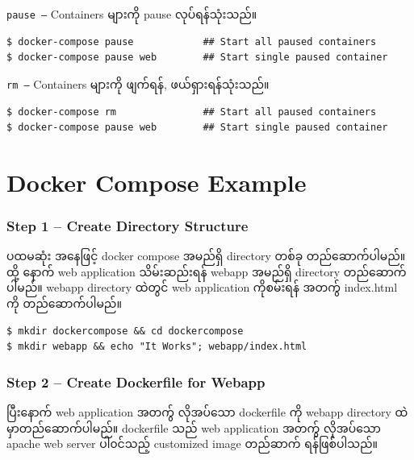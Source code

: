 \documentclass[]{article}
\begin{document}
\texttt{pause\ –} Containers များကို pause လုပ်ရန်သုံးသည်။

\begin{verbatim}
$ docker-compose pause            ## Start all paused containers
$ docker-compose pause web        ## Start single paused container
\end{verbatim}

\texttt{rm\ –} Containers များကို ဖျက်ရန်, ဖယ်ရှားရန်သုံးသည်။

\begin{verbatim}
$ docker-compose rm               ## Start all paused containers
$ docker-compose pause web        ## Start single paused container
\end{verbatim}

\pagebreak

\hypertarget{docker-compose-example}{%
\section{Docker Compose Example}\label{docker-compose-example}}

\hypertarget{step-1-create-directory-structure}{%
\subsubsection{Step 1 -- Create Directory
Structure}\label{step-1-create-directory-structure}}

ပထမဆုံး အနေဖြင့် docker compose အမည်ရှိ directory တစ်ခု တည်ဆောက်ပါမည်။
ထို့ နောက် web application သိမ်းဆည်းရန် webapp အမည်ရှိ directory
တည်ဆောက်ပါမည်။ webapp directory ထဲတွင် web application ကိုစမ်းရန် အတက်ွ
index.html ကို တည်ဆောက်ပါမည်။

\begin{verbatim}
$ mkdir dockercompose && cd dockercompose
$ mkdir webapp && echo "It Works"; webapp/index.html
\end{verbatim}

\hypertarget{step-2-create-dockerfile-for-webapp}{%
\subsubsection{Step 2 -- Create Dockerfile for
Webapp}\label{step-2-create-dockerfile-for-webapp}}

ပြီးနောက် web application အတက်ွ လိုအပ်သော dockerfile ကို webapp
directory ထဲမှာတည်ဆောက်ပါမည်။ dockerfile သည် web application အတက်ွ
လိုအပ်သော apache web server ပါ၀င်သည့် customized image တည်ဆာက်
ရန်ဖြစ်ပါသည်။
\end{document}
